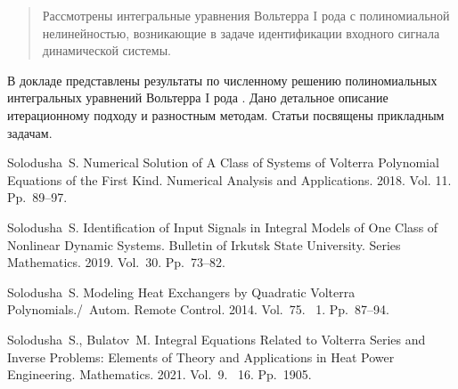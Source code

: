 \maketitle

\begin{abstract}
Рассмотрены интегральные уравнения Вольтерра I рода с полиномиальной нелинейностью, возникающие в задаче идентификации входного сигнала динамической системы.

\end{abstract}


В докладе представлены результаты по численному решению полиномиальных интегральных уравнений Вольтерра I рода \cite{solodusha1, solodusha2}. Дано детальное описание итерационному подходу и разностным методам. Статьи \cite{solodusha3, solodusha4}  посвящены прикладным задачам.




%

\begin{thebibliography}{9} %
  Solodusha~S. Numerical Solution of A Class of Systems of Volterra Polynomial Equations of the First Kind. Numerical Analysis and Applications. 2018. Vol. 11. Pp.~89--97. 

  Solodusha~S. Identification of Input Signals in Integral Models of One Class of Nonlinear  Dynamic Systems. Bulletin of Irkutsk State University. Series Mathematics. 2019. Vol.~30. Pp.~73--82.

 Solodusha~S. Modeling Heat Exchangers by Quadratic Volterra Polynomials./~Autom. Remote Control. 2014. Vol.~75.  \textnumero~1. Pp.~87--94.  

 Solodusha~S., Bulatov~M. Integral Equations Related to Volterra Series and Inverse Problems:
Elements of Theory and Applications in Heat Power Engineering. Mathematics. 2021. Vol.~9.  \textnumero~16. Pp.~1905. 

\end{thebibliography}





%
